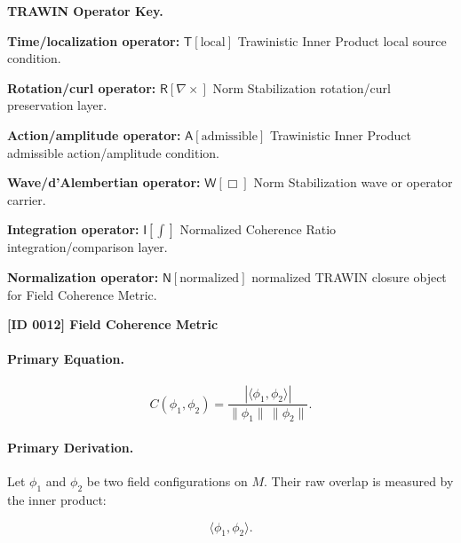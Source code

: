 \par\vspace{0.45\baselineskip}
\noindent\begin{minipage}[t]{\linewidth}
\begingroup
\small
\raggedright
\textbf{TRAWIN Operator Key.}\par
\noindent\textbf{Time/localization operator:} $\mathsf{T}\!\left[\mathrm{local}\right]$ Trawinistic Inner Product local source condition.\par
\noindent\textbf{Rotation/curl operator:} $\mathsf{R}\!\left[\nabla\times\right]$ Norm Stabilization rotation/curl preservation layer.\par
\noindent\textbf{Action/amplitude operator:} $\mathsf{A}\!\left[\mathrm{admissible}\right]$ Trawinistic Inner Product admissible action/amplitude condition.\par
\noindent\textbf{Wave/d'Alembertian operator:} $\mathsf{W}\!\left[\Box\right]$ Norm Stabilization wave or operator carrier.\par
\noindent\textbf{Integration operator:} $\mathsf{I}\!\left[\int\right]$ Normalized Coherence Ratio integration/comparison layer.\par
\noindent\textbf{Normalization operator:} $\mathsf{N}\!\left[\mathrm{normalized}\right]$ normalized TRAWIN closure object for Field Coherence Metric.\par
\endgroup
\end{minipage}

\clearpage
\noindent\textbf{[ID 0012] Field Coherence Metric}\par
\vspace{0.35em}
\paragraph{Primary Equation.}
\begin{equation}
C(\phi_1,\phi_2)
=
\frac{
\left|\langle \phi_1,\phi_2\rangle\right|
}{
\lVert \phi_1\rVert\,\lVert \phi_2\rVert
}.
\end{equation}

\paragraph{Primary Derivation.}
Let $\phi_1$ and $\phi_2$ be two field configurations on $M$.  
Their raw overlap is measured by the inner product:

\begin{equation}
\langle \phi_1,\phi_2\rangle .
\end{equation}

